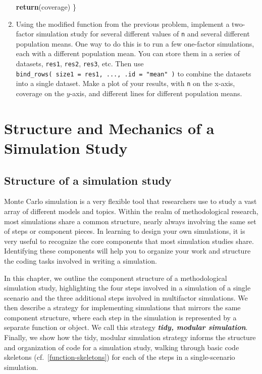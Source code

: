 \documentclass[
]{book}
\newenvironment{Shaded}{\begin{snugshade}}{\end{snugshade}}
\newcommand{\FunctionTok}[1]{\textcolor[rgb]{0.13,0.29,0.53}{\textbf{#1}}}
\newcommand{\NormalTok}[1]{#1}
\begin{document}
\begin{enumerate}
\begin{Shaded}
\begin{Highlighting}[]
  \FunctionTok{return}\NormalTok{(coverage)}
\NormalTok{\}}
\end{Highlighting}
\end{Shaded}
\item
  Using the modified function from the previous problem, implement a two-factor simulation study for several different values of \texttt{n} and several different population means.
  One way to do this is to run a few one-factor simulations, each with a different population mean. You can store them in a series of datasets, \texttt{res1}, \texttt{res2}, \texttt{res3}, etc.
  Then use \texttt{bind\_rows(\ size1\ =\ res1,\ ...,\ .id\ =\ "mean"\ )} to combine the datasets into a single dataset.
  Make a plot of your results, with \texttt{n} on the x-axis, coverage on the \(y\)-axis, and different lines for different population means.
\end{enumerate}

\part{Structure and Mechanics of a Simulation Study}\label{part-structure-and-mechanics-of-a-simulation-study}

\chapter{Structure of a simulation study}\label{simulation-structure}

Monte Carlo simulation is a very flexible tool that researchers use to study a vast array of different models and topics.
Within the realm of methodological research, most simulations share a common structure, nearly always involving the same set of steps or component pieces.
In learning to design your own simulations, it is very useful to recognize the core components that most simulation studies share.
Identifying these components will help you to organize your work and structure the coding tasks involved in writing a simulation.

In this chapter, we outline the component structure of a methodological simulation study, highlighting the four steps involved in a simulation of a single scenario and the three additional steps involved in multifactor simulations.
We then describe a strategy for implementing simulations that mirrors the same component structure, where each step in the simulation is represented by a separate function or object.
We call this strategy \textbf{\emph{tidy, modular simulation}}.
Finally, we show how the tidy, modular simulation strategy informs the structure and organization of code for a simulation study, walking through basic code skeletons (cf.~\ref{function-skeletons}) for each of the steps in a single-scenario simulation.
\end{document}
